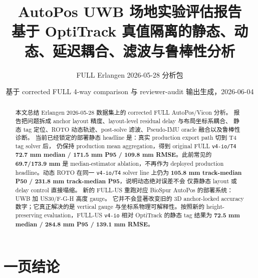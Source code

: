 \documentclass[UTF8,11pt,a4paper]{ctexart}
\title{\textbf{AutoPos UWB 场地实验评估报告}\\
\large 基于 OptiTrack 真值隔离的静态、动态、延迟耦合、滤波与鲁棒性分析}
\author{FULL Erlangen 2026-05-28 分析包}
\date{基于 corrected FULL 4-way comparison 与 reviewer-audit 输出生成，2026-06-04}
\newcommand{\case}[1]{\texttt{#1}}
\begin{document}
\maketitle

\begin{abstract}
本文总结 Erlangen 2026-05-28 数据集上的 corrected FULL AutoPos/Vicon 分析。
报告把问题拆成 anchor layout 精度、layout-level residual delay 与布局坐标系耦合、
静态 tag 定位、ROTO 动态轨迹、post-solve 滤波、Pseudo-IMU oracle 融合以及鲁棒性诊断。
当前已经锁定的部署静态 headline 是：真实 production export path 切到 T4 tag solver 后，
仍保持 production mean aggregation，得到 original FULL \case{v4-io/T4}
\textbf{72.7 mm median / 171.5 mm P95 / 109.8 mm RMSE}。此前常见的
\textbf{69.7/173.9 mm} 是 median-estimator ablation，不再作为 deployed production
headline。动态 ROTO 在同一 \case{v4-io/T4} solver line 上仍为
\textbf{105.8 mm track-median P50 / 231.8 mm track-median P95}，说明动态绝对误差不会
仅靠静态 layout 或 delay control 直接塌缩。
新的 FULL-US 重跑对应 BioSpur AutoPos 的部署系统：UWB 加 US30/F-G-H 高度 gauge。
它并不会显著改变旧的 3D anchor-locked accuracy 数字；它真正解决的是 vertical gauge
与坐标系物理可解释性。按照新的 height-preserving evaluation，FULL-US \case{v4-io}
相对 OptiTrack 的静态 tag 结果为 \textbf{72.5 mm median / 284.8 mm P95 / 139.1 mm RMSE}。
\end{abstract}

\section{一页结论}
\end{document}
